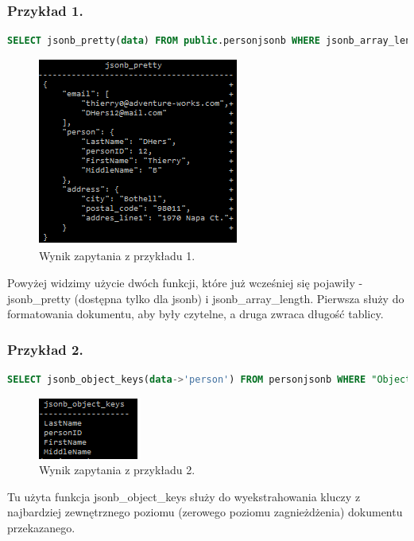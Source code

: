 \documentclass[a4paper,12pt,table]{article}
\begin{document}
{\subsubsection*{Przykład 1.}
\begin{lstlisting}[language=SQL,basicstyle=\footnotesize]
SELECT jsonb_pretty(data) FROM public.personjsonb WHERE jsonb_array_length(data->'email') = 2 LIMIT 1;
\end{lstlisting}
\vspace{0.5cm}
\begin{figure}[h]
\begin{center}
\includegraphics[scale=0.8]{sc/31}
\end{center}
\caption{Wynik zapytania z przykładu 1.}
\end{figure}%
Powyżej widzimy użycie dwóch funkcji, które już wcześniej się pojawiły - jsonb\_pretty (dostępna tylko dla jsonb) i jsonb\_array\_length. Pierwsza służy do formatowania dokumentu, aby były czytelne, a druga zwraca długość tablicy.
\subsubsection*{Przykład 2.}
\begin{lstlisting}[language=SQL,basicstyle=\footnotesize]
SELECT jsonb_object_keys(data->'person') FROM personjsonb WHERE "ObjectID" = 1921;
\end{lstlisting}
\vspace{0.5cm}
\begin{figure}[h]
\begin{center}
\includegraphics[scale=1]{sc/32}
\end{center}
\caption{Wynik zapytania z przykładu 2.}
\end{figure}%
Tu użyta funkcja jsonb\_object\_keys służy do wyekstrahowania kluczy z najbardziej zewnętrznego poziomu (zerowego poziomu zagnieżdżenia) dokumentu przekazanego.
\newpage
}
\end{document}
